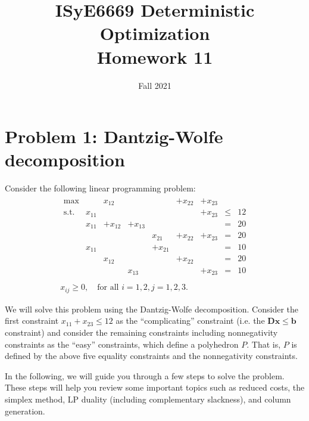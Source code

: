 \documentclass[11pt]{article}
\title{ISyE6669 Deterministic Optimization\\ Homework 11}
\author{Fall 2021}
\date{}
\newcommand{\mb}[1]{\ensuremath{\boldsymbol{#1}}}
\begin{document}
\maketitle

\section*{Problem 1: Dantzig-Wolfe decomposition}

Consider the following linear programming problem:
\begin{eqnarray*}
\begin{array}{ccccccccc}
\max 		& 	 	   & x_{12}   &               &  			& + x_{22} & + x_{23}  &    & \\
\text{s.t.}  & x_{11} &              &               &               &               & + x_{23} & \leq & 12 \\
			& x_{11} & +x_{12} & + x_{13} &  			&               &               & = & 20 \\
			&            &             &               & x_{21}     & + x_{22} & + x_{23} & = & 20  \\
                & x_{11} &             &               & +x_{21}     &              &                & = & 10 \\
                &            & x_{12}  &              &                & +x_{22}   &               & = & 20 \\
                &            &            & x_{13}   &                &               & +x_{23}   & = & 10  \\               
\end{array}\\
x_{ij}\geq 0, \quad\text{for all $i=1,2, j=1,2,3$.}
\end{eqnarray*}



We will solve this problem using the Dantzig-Wolfe decomposition. Consider the first constraint $x_{11}+x_{23}\leq 12$ as the ``complicating'' constraint (i.e. the $\mb{Dx}\leq\mb{b}$ constraint) and consider the remaining constraints including nonnegativity constraints as the ``easy'' constraints, which define a polyhedron $P$. That is, $P$ is defined by the above five equality constraints and the nonnegativity constraints.

In the following, we will guide you through a few steps to solve the problem. These steps will help you review some important topics such as reduced costs, the simplex method, LP duality (including complementary slackness), and column generation. 
\end{document}
